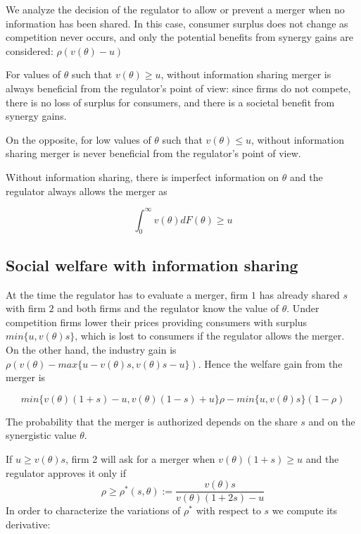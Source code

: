 \documentclass[a4paper,leqno]{article}%
\renewcommand{\t}{\theta}
\begin{document}
We analyze the decision of the regulator to allow or prevent a merger when no information has been shared. In this case, consumer surplus does not change as competition never occurs, and only the potential benefits from synergy gains are considered: $\rho (v(\t)-u)$

For values of $\t$ such that $v(\t)\geq u$, without information sharing merger is always beneficial from the regulator's point of view: since firms do not compete, there is no loss of surplus for consumers, and there is a societal benefit from synergy gains.

On the opposite, for low values of $\t$ such that $v(\t)\leq u$, without information sharing merger is never beneficial from the regulator's point of view.

Without information sharing, there is imperfect information on $\t$ and the regulator always allows the merger as 

\[
\int_{0}^{\infty}v(\t)dF(\t)\geq u
\]

\medskip

\subsection{Social welfare with information sharing}

\medskip

At the time the regulator has to evaluate a merger, firm $1$ has already shared $s$ with firm $2$ and both firms and the regulator know the value of $\t$. Under competition firms lower their prices providing consumers with surplus $min\{u,v(\t)s\}$, which is lost to consumers if the regulator allows the merger. On the other hand, the industry gain is $\rho (v(\t)-max\{u-v(\t)s,v(\t)s-u\})$. Hence the welfare gain from the merger is

\[
min\{v(\t)(1+s)-u,v(\t)(1-s)+u\}\rho-min\{u,v(\t)s\}(1-\rho)
\]




The probability that the merger is authorized depends on the share $s$ and on the synergistic value $\t$. 

If $u\geq v(\t)s$, firm 2 will ask for a merger when $v(\t)(1+s)\geq u$ and the regulator approves it only if  
    \begin{equation}
           \rho\geq \rho^*(s,\t):=\frac{v(\t)s}{v(\t)(1+2s)-u}
    \end{equation}
In order to characterize the variations of $\rho^*$ with respect to $s$ we compute its derivative:
\end{document}
